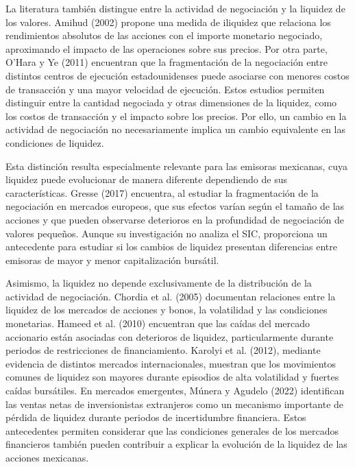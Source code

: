 La literatura también distingue entre la actividad de negociación y la liquidez de los valores. Amihud (2002) propone una medida de iliquidez que relaciona los rendimientos absolutos de las acciones con el importe monetario negociado, aproximando el impacto de las operaciones sobre sus precios. Por otra parte, O'Hara y Ye (2011) encuentran que la fragmentación de la negociación entre distintos centros de ejecución estadounidenses puede asociarse con menores costos de transacción y una mayor velocidad de ejecución. Estos estudios permiten distinguir entre la cantidad negociada y otras dimensiones de la liquidez, como los costos de transacción y el impacto sobre los precios. Por ello, un cambio en la actividad de negociación no necesariamente implica un cambio equivalente en las condiciones de liquidez.

Esta distinción resulta especialmente relevante para las emisoras mexicanas, cuya liquidez puede evolucionar de manera diferente dependiendo de sus características. Gresse (2017) encuentra, al estudiar la fragmentación de la negociación en mercados europeos, que sus efectos varían según el tamaño de las acciones y que pueden observarse deterioros en la profundidad de negociación de valores pequeños. Aunque su investigación no analiza el SIC, proporciona un antecedente para estudiar si los cambios de liquidez presentan diferencias entre emisoras de mayor y menor capitalización bursátil.

Asimismo, la liquidez no depende exclusivamente de la distribución de la actividad de negociación. Chordia et al. (2005) documentan relaciones entre la liquidez de los mercados de acciones y bonos, la volatilidad y las condiciones monetarias. Hameed et al. (2010) encuentran que las caídas del mercado accionario están asociadas con deterioros de liquidez, particularmente durante periodos de restricciones de financiamiento. Karolyi et al. (2012), mediante evidencia de distintos mercados internacionales, muestran que los movimientos comunes de liquidez son mayores durante episodios de alta volatilidad y fuertes caídas bursátiles. En mercados emergentes, Múnera y Agudelo (2022) identifican las ventas netas de inversionistas extranjeros como un mecanismo importante de pérdida de liquidez durante periodos de incertidumbre financiera. Estos antecedentes permiten considerar que las condiciones generales de los mercados financieros también pueden contribuir a explicar la evolución de la liquidez de las acciones mexicanas.

